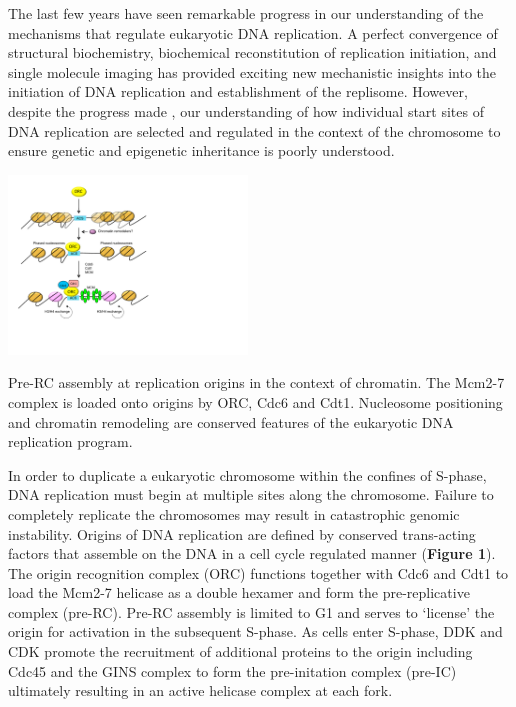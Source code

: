 The last few years have seen remarkable progress in our understanding of the mechanisms that regulate eukaryotic DNA replication.  A perfect convergence of structural biochemistry\citep{Bleichert2015-zl}, biochemical reconstitution of replication initiation\citep{Yeeles2015-pe}, and single molecule imaging\citep{Ticau2015-gg} has provided exciting new mechanistic insights into the initiation of DNA replication and establishment of the replisome.  However, despite the progress made \invitro, our understanding of how individual start sites of DNA replication are selected and regulated in the context of the chromosome to ensure genetic and epigenetic inheritance is poorly understood\citep{Prioleau2016-bj}. 
\begin{floatingfigure}[r]{2.5in}
\vspace{-8mm}
\begin{center}
\includegraphics[width=2.5in]{r35_figures/orc_turnover_model.pdf}
\end{center}
\vspace{3mm}
\caption{Pre-RC assembly at replication origins in the context of chromatin. The Mcm2-7 complex is loaded onto origins by ORC, Cdc6 and Cdt1. Nucleosome positioning and chromatin remodeling are conserved features of the eukaryotic DNA replication program\citep{Ding2011-ni}.}%
\end{floatingfigure}

In order to duplicate a eukaryotic chromosome within the confines of S-phase, DNA replication must begin at multiple sites along the chromosome.  Failure to completely replicate the chromosomes may result in catastrophic genomic instability\citep{Green2010-ht}.  Origins of DNA replication are defined by conserved trans-acting factors that assemble on the DNA in  a cell cycle regulated manner ({\color{dukeblue}\textbf{Figure 1}}). The origin recognition complex (ORC) functions together with Cdc6 and Cdt1 to load the Mcm2-7 helicase as a double hexamer and form the pre-replicative complex (pre-RC)\citep{Bell2013-pk}. Pre-RC assembly is limited to G1 and serves to `license' the origin for activation in the subsequent S-phase\citep{Siddiqui2013-jz}. As cells enter S-phase, DDK and CDK promote the recruitment of additional proteins to the origin including Cdc45 and the GINS complex to form the pre-initation complex (pre-IC)\citep{Tanaka2013-fl} ultimately resulting in an active helicase complex at each fork.   



